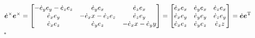 \begin{equation}
	\dot{\bm{e}}^\times \bm{e}^\times = 
	\begin{bmatrix}
		-\dot{e}_y e_y - \dot{e}_z e_z & \dot{e}_y e_x & \dot{e}_z e_x \\
		\dot{e}_x e_y & - \dot{e}_x x - \dot{e}_z e_z & \dot{e}_z e_y \\
		\dot{e}_x e_z & \dot{e}_y e_z & - \dot{e}_x x - \dot{e}_y y
	\end{bmatrix}
	=
	\begin{bmatrix}
		\dot{e}_x e_x & \dot{e}_y e_x & \dot{e}_z e_x \\
		\dot{e}_x e_y & \dot{e}_y e_y & \dot{e}_z e_y \\
		\dot{e}_x e_z & \dot{e}_y e_z & \dot{e}_z z
	\end{bmatrix}
	=\dot{\bm{e}} \bm{e}^{\text{T}}
\end{equation}
\hfill $\square$































